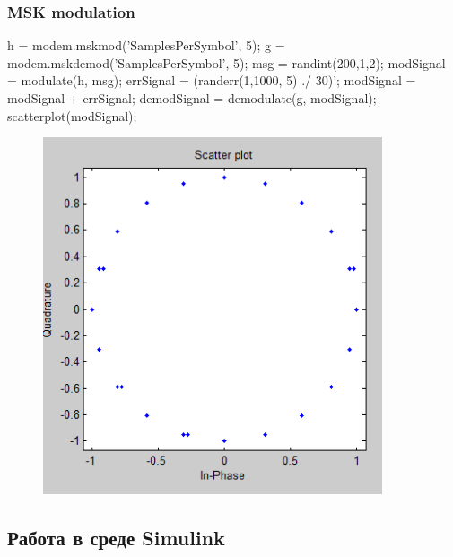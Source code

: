\documentclass[10pt,a4paper]{article}
\begin{document}
\subsubsection{MSK modulation}
h = modem.mskmod('SamplesPerSymbol', 5); \newline
g = modem.mskdemod('SamplesPerSymbol', 5); \newline
msg = randint(200,1,2); \newline
modSignal = modulate(h, msg); \newline
errSignal = (randerr(1,1000, 5) ./ 30)'; \newline
modSignal = modSignal + errSignal; \newline
demodSignal = demodulate(g, modSignal); \newline
scatterplot(modSignal); \newline
\begin{figure}[h]
\centering
\includegraphics[width=10cm]{1_5.png}  
\end{figure}
\FloatBarrier
\subsection{Работа в среде Simulink}
\end{document}
